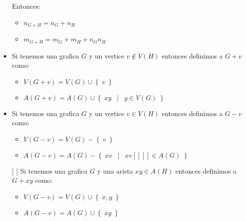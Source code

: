 \documentclass[12pt, fleqn]{report}                             %
\DeclareMathOperator \Space     {\quad}                         %
\DeclareMathOperator \MiniSpace {\;}                            %
\newcommand \Such           {\MiniSpace | \MiniSpace}           %
\theoremstyle{break}                                            %
\newcommand{\Set}[1]            {\left\{ \; #1 \; \right\}}     %
\begin{document}
\begin{itemize}
                        Entonces:
                        \begin{itemize}
                            \item $n_{G+H} = n_G + n_H$
                            \item $m_{G+H} = m_G + m_H + n_G n_H$
                        \end{itemize}

                        \item 
                        Si tenemos una grafica $G$ y un vertice $v \not \in V(H)$
                        entonces definimos a $G + v$ como:
                        \begin{itemize}
                            \item $V(G + v) = V(G) \cup \Set{v}$
                            \item $A(G + v) = A(G) \cup \Set{xy \Such y \in V(G)}$
                        \end{itemize}

                        \item 
                        Si tenemos una grafica $G$ y un vertice $v\in V(H)$
                        entonces definimos a $G - v$ como:
                        \begin{itemize}
                            \item $V(G - v) = V(G) - \Set{v}$
                            \item $A(G - v) = A(G) - \Set{xv \Such xv[[]] \in A(G)}$
                        \end{itemize}

                        \item [[]]
                        Si tenemos una grafica $G$ y una arista $xy \in A(H)$
                        entonces definimos a $G + xy$ como:
                        \begin{itemize}
                            \item $V(G - v) = V(G) \cup \Set{x, y}$
                            \item $A(G - v) = A(G) \cup \Set{xy}$
                        \end{itemize}

                \end{itemize}
            
            
\end{document}
